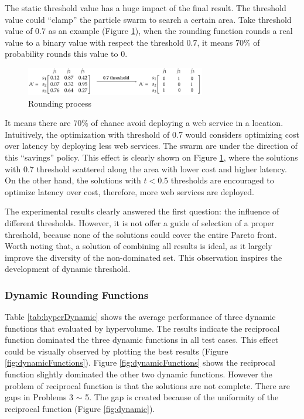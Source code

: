 The static threshold value has a huge impact of the final result. 
The threshold value could ``clamp'' the  particle swarm to search a certain area. Take threshold value of 0.7 as an example (Figure \ref{fig:roundstatic}), 
when the rounding function rounds a real value to a binary value with respect the threshold 0.7, it means 70\% of probability 
rounds this value to 0. 

\begin{figure}[H]
\centering
  \includegraphics[width=0.7\textwidth]{pics/roundstatic.png}
  \caption{Rounding process}
  \label{fig:roundstatic}
\end{figure}

It means there are 70\% of chance avoid deploying a web service in a location. 
Intuitively, the optimization with threshold of 0.7 would considers optimizing cost over latency by deploying less web services. The swarm are under the 
direction of this ``savings'' policy. This effect is clearly shown on Figure \ref{fig:roundstatic}, where the solutions with 0.7 threshold 
scattered along the area with lower cost and higher latency. On the other hand, the solutions with $t< 0.5$ thresholds  are encouraged to optimize latency
over cost, therefore, more web services are deployed.

The experimental results clearly answered the first question: the influence of different thresholds. 
However, it is not offer a guide of selection of a proper threshold, because none of the solutions could cover the entire Pareto front.
Worth noting that, a solution of combining all results is ideal, as it largely improve the diversity of the non-dominated set. This observation inspires 
the development of dynamic threshold.

\subsubsection{Dynamic Rounding Functions}
\label{sec:expdy}
Table \ref{tab:hyperDynamic} shows the average performance of three dynamic functions that evaluated by hypervolume. 
The results indicate the reciprocal function dominated the three dynamic functions in all test cases. This effect could be visually observed by plotting the best results (Figure \ref{fig:dynamicFunctions}). 
Figure \ref{fig:dynamicFunctions} shows the reciprocal function slightly dominated the other two dynamic functions. 
However the problem of reciprocal function is that the solutions are not complete. There are gaps in Problems 3 $\sim$ 5. The gap is created because of the uniformity of the reciprocal function (Figure \ref{fig:dynamic}).

